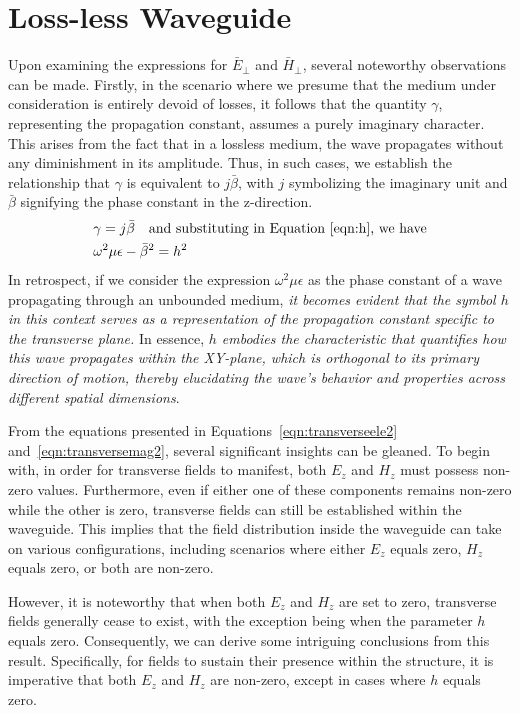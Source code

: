 \section{Loss-less Waveguide}
Upon examining the expressions for $\bar{E}_\bot$ and $\bar{H}_\bot$, several noteworthy observations can be made. Firstly, in the scenario where we presume that the medium under consideration is entirely devoid of losses, it follows that the quantity $\gamma$, representing the propagation constant, assumes a purely imaginary character. This arises from the fact that in a lossless medium, the wave propagates without any diminishment in its amplitude. Thus, in such cases, we establish the relationship that $\gamma$ is equivalent to $j\bar{\beta}$, with $j$ symbolizing the imaginary unit and $\bar{\beta}$ signifying the phase constant in the z-direction.
\begin{align*}
&\gamma = j\bar{\beta}\quad\text{and substituting in Equation~\ref{eqn:h}, we have}\\
&\omega^2\mu\epsilon - \bar{\beta}^2 = h^2
\end{align*}
In retrospect, if we consider the expression $\omega^2\mu\epsilon$ as the phase constant of a wave propagating through an unbounded medium, \emph{it becomes evident that the symbol $h$ in this context serves as a representation of the propagation constant specific to the transverse plane.} In essence, \emph{$h$ embodies the characteristic that quantifies how this wave propagates within the XY-plane, which is orthogonal to its primary direction of motion, thereby elucidating the wave's behavior and properties across different spatial dimensions}.

From the equations presented in Equations~\eqref{eqn:transverseele2} and~\eqref{eqn:transversemag2}, several significant insights can be gleaned. To begin with, in order for transverse fields to manifest, both $E_z$ and $H_z$ must possess non-zero values. Furthermore, even if either one of these components remains non-zero while the other is zero, transverse fields can still be established within the waveguide. This implies that the field distribution inside the waveguide can take on various configurations, including scenarios where either $E_z$ equals zero, $H_z$ equals zero, or both are non-zero.

However, it is noteworthy that when both $E_z$ and $H_z$ are set to zero, transverse fields generally cease to exist, with the exception being when the parameter $h$ equals zero. Consequently, we can derive some intriguing conclusions from this result. Specifically, for fields to sustain their presence within the structure, it is imperative that both $E_z$ and $H_z$ are non-zero, except in cases where $h$ equals zero.

